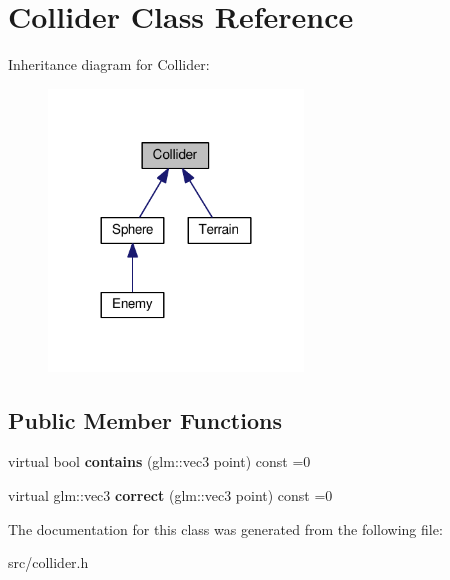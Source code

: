 \hypertarget{class_collider}{}\section{Collider Class Reference}
\label{class_collider}


Inheritance diagram for Collider\+:\nopagebreak
\begin{figure}[H]
\begin{center}
\leavevmode
\includegraphics[width=192pt]{class_collider__inherit__graph}
\end{center}
\end{figure}
\subsection*{Public Member Functions}
\begin{DoxyCompactItemize}
\item 
\hypertarget{class_collider_ae852216c6d07c0221167a48d0d2f7020}{}virtual bool {\bfseries contains} (glm\+::vec3 point) const  =0\label{class_collider_ae852216c6d07c0221167a48d0d2f7020}

\item 
\hypertarget{class_collider_ad911610da1f4f9c28f66c4b3bedcce84}{}virtual glm\+::vec3 {\bfseries correct} (glm\+::vec3 point) const  =0\label{class_collider_ad911610da1f4f9c28f66c4b3bedcce84}

\end{DoxyCompactItemize}


The documentation for this class was generated from the following file\+:\begin{DoxyCompactItemize}
\item 
src/collider.\+h\end{DoxyCompactItemize}
